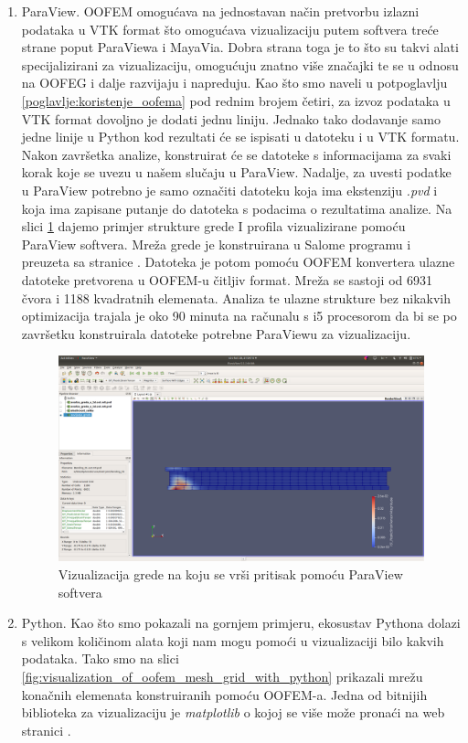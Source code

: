\documentclass[a4paper,twoside,12pt]{memoir} %
\begin{document}
\begin{enumerate}
    \item ParaView. OOFEM omogućava na jednostavan način pretvorbu izlazni podataka u VTK format što omogućava vizualizaciju putem softvera treće strane poput ParaViewa i MayaVia. Dobra strana toga je to što su takvi alati specijalizirani za vizualizaciju, omogućuju znatno više značajki te se u odnosu na OOFEG i dalje razvijaju i napreduju. Kao što smo naveli u potpoglavlju \ref{poglavlje:koristenje_oofema} pod rednim brojem četiri, za izvoz podataka u VTK format dovoljno je dodati jednu liniju. Jednako tako dodavanje samo jedne linije u Python kod rezultati će se ispisati u datoteku i u VTK formatu. Nakon završetka analize, konstruirat će se datoteke s informacijama za svaki korak koje se uvezu u našem slučaju u ParaView. Nadalje, za uvesti podatke u ParaView potrebno je samo označiti datoteku koja ima ekstenziju \textit{.pvd} i koja ima zapisane putanje do datoteka s podacima o rezultatima analize. Na slici \ref{fig:paraview_example} dajemo primjer strukture grede I profila vizualizirane pomoću ParaView softvera. Mreža grede je konstruirana u Salome programu i preuzeta sa stranice \cite{oofem-web}. Datoteka je potom pomoću OOFEM konvertera ulazne datoteke pretvorena u OOFEM-u čitljiv format. Mreža se sastoji od 6931 čvora i 1188 kvadratnih elemenata. Analiza te ulazne strukture bez nikakvih optimizacija trajala je oko 90 minuta na računalu s i5 procesorom da bi se po završetku konstruirala datoteke potrebne ParaViewu za vizualizaciju.
        \begin{figure}[h!t]
        \begin{center}
        \includegraphics[scale=0.2]{pictures/chapter_oofem/paraview_beam_bending_full.png}
        \caption{Vizualizacija grede na koju se vrši pritisak pomoću ParaView softvera}
        \label{fig:paraview_example}
        \end{center}
        \end{figure}
    \item Python. Kao što smo pokazali na gornjem primjeru, ekosustav Pythona dolazi s velikom količinom alata koji nam mogu pomoći u vizualizaciji bilo kakvih podataka. Tako smo na slici \ref{fig:visualization_of_oofem_mesh_grid_with_python} prikazali mrežu konačnih elemenata konstruiranih pomoću OOFEM-a. Jedna od bitnijih biblioteka za vizualizaciju je \textit{matplotlib} o kojoj se više može pronaći na web stranici \cite{matplotlib_web}.
\end{enumerate}
\end{document}
